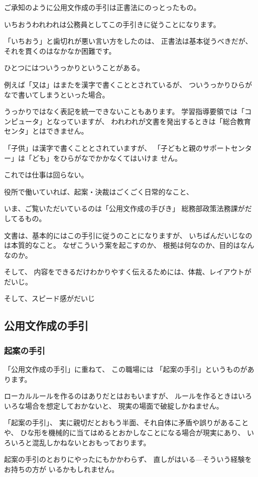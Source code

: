 \documentclass[uplatex,jis2004,dvipdfmx,12pt]{jsarticle}
\begin{document}
ご承知のように公用文作成の手引は正書法にのっとったもの。

いちおうわれわれは公務員としてこの手引きに従うことになります。

「いちおう」と歯切れが悪い言い方をしたのは、
正書法は基本従うべきだが、それを貫くのはなかなか困難です。

ひとつにはついうっかりということがある。

例えば「又は」はまたを漢字で書くこととされているが、
ついうっかりひらがなで書いてしまうといった場合。

うっかりではなく表記を統一できないこともあります。
学習指導要領では「コンピュータ」となっていますが、
われわれが文書を発出するときは「総合教育センタ」とはできません。

「子供」は漢字で書くこととされていますが、
「子どもと親のサポートセンター」は「ども」をひらがなでかかなくてはいけま
せん。

これでは仕事は回らない。

役所で働いていれば、起案・決裁はごくごく日常的なこと、

いま、ご覧いただいているのは「公用文作成の手びき」
総務部政策法務課がだしてるもの。


文書は、基本的にはこの手引に従うのことになりますが、
いちばんだいじなのは本質的なこと。
なぜこういう案を起こすのか、
根拠は何なのか、目的はなんなのか。

そして、
内容をできるだけわかりやすく伝えるためには、体裁、レイアウトがだいじ。

そして、スピード感がだいじ
\fi


\subsection{公用文作成の手引}

\subsubsection{起案の手引}
「公用文作成の手引」に重ねて、
この職場には
「起案の手引」というものがあります。


ローカルルールを作るのはありだとはおもいますが、
ルールを作るときはいろいろな場合を想定しておかないと、
現実の場面で破綻しかねません。


「起案の手引」、
実に親切だとおもう半面、それ自体に矛盾や誤りがあることや、
ひな形を機械的に当てはめるとおかしなことになる場合が現実にあり、
いろいろと混乱しかねないとおもっております。

起案の手引のとおりにやったにもかかわらず、
直しがはいる---そういう経験をお持ちの方が
いるかもしれません。
\end{document}
